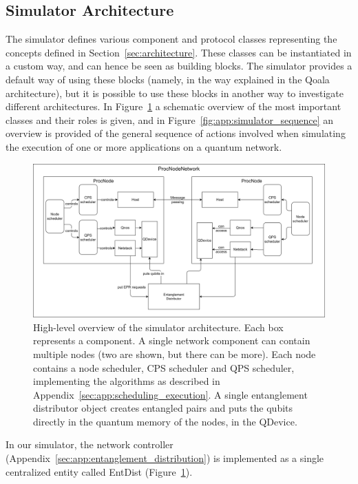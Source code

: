 \subsection{Simulator Architecture}
The simulator defines various component and protocol classes representing the concepts defined in Section~\ref{sec:architecture}. These classes can be instantiated in a custom way, and can hence be seen as building blocks. The simulator provides a default way of using these blocks (namely, in the way explained in the Qoala architecture), but it is possible to use these blocks in another way to investigate different architectures.
In Figure~\ref{fig:app:simulator} a schematic overview of the most important classes and their roles is given, and in Figure~\ref{fig:app:simulator_sequence} an overview is provided of the general sequence of actions involved when simulating the execution of one or more applications on a quantum network.


\begin{figure}[hp]
    \centering
    \includegraphics[width=\textwidth]{figures/qoala/simulator.png}
    \caption{High-level overview of the simulator architecture. Each box represents a component.
    A single network component can contain multiple nodes (two are shown, but there can be more).
    Each node contains a node scheduler, CPS scheduler and QPS scheduler, implementing the algorithms as described in Appendix~\ref{sec:app:scheduling_execution}.
    A single entanglement distributor object creates entangled pairs and puts the qubits directly in the quantum memory of the nodes, in the QDevice.
    }
    \label{fig:app:simulator}
\end{figure}

In our simulator, the network controller (Appendix~\ref{sec:app:entanglement_distribution})
is implemented as a single centralized entity called EntDist (Figure~\ref{fig:app:simulator}).

